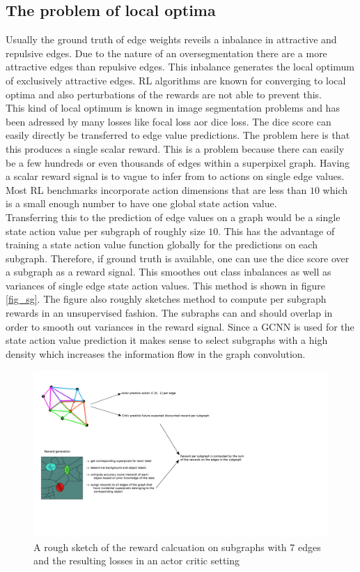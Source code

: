 \subsection{The problem of local optima}
Usually the ground truth of edge weights reveils a inbalance in attractive and repulsive edges. Due to the nature of an oversegmentation there are a more attractive edges than repulsive edges. This inbalance generates the local optimum of exclusively attractive edges. RL algorithms are known for converging to local optima and also perturbations of the rewards are not able to prevent this.\\
This kind of local optimum is known in image segmentation problems and has been adressed by many losses like focal loss aor dice loss. The dice score can easily directly be transferred to edge value predictions. The problem here is that this produces a single scalar reward. This is a problem because there can easily be a few hundreds or even thousands of edges within a superpixel graph. Having a scalar reward signal is to vague to infer from to actions on single edge values.\\
Most RL benchmarks incorporate action dimensions that are less than $10$ which is a small enough number to have one global state action value.\\
Transferring this to the prediction of edge values on a graph would be a single state action value per subgraph of roughly size $10$. This has the advantage of training a state action value function globally for the predictions on each subgraph. Therefore, if ground truth is available, one can use the dice score over a subgraph as a reward signal. This smoothes out class inbalances as well as variances of single edge state action values. This method is shown in figure \ref{fig_sg}. The figure also roughly sketches method to compute per subgraph rewards in an unsupervised fashion. The subraphs can and should overlap in order to smooth out variances in the reward signal. Since a GCNN is used for the state action value prediction it makes sense to select subgraphs with a high density which increases the information flow in the graph convolution.

\begin{figure}[ht!]
	\centering
	\includegraphics[width=1.5\textwidth]{figures/images/reward_calc_sketch.png}
	\caption{A rough sketch of the reward calcuation on subgraphs with 7 edges and the resulting losses in an actor critic setting}
	\label{overview}
\end{figure}

